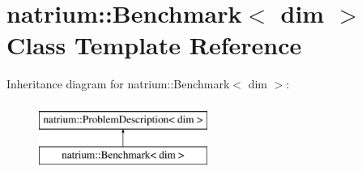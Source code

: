 \hypertarget{classnatrium_1_1Benchmark}{\section{natrium\-:\-:Benchmark$<$ dim $>$ Class Template Reference}
\label{classnatrium_1_1Benchmark}
}
Inheritance diagram for natrium\-:\-:Benchmark$<$ dim $>$\-:\begin{figure}[H]
\begin{center}
\leavevmode
\includegraphics[height=2.000000cm]{classnatrium_1_1Benchmark}
\end{center}
\end{figure}
